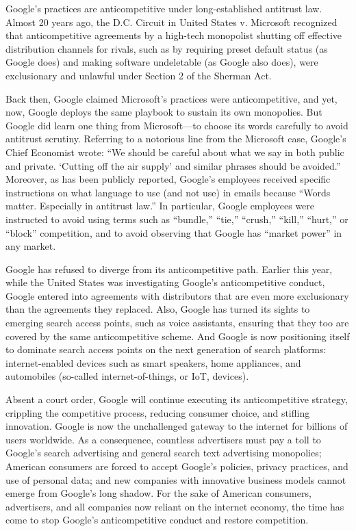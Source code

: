 \documentclass[11pt,b5paper,headings=small]{scrartcl}
\begin{document}

Google’s practices are anticompetitive under long-established antitrust law.
Almost 20 years ago, the D.C. Circuit in United States v. Microsoft recognized that
anticompetitive agreements by a high-tech monopolist shutting off effective distribution channels
for rivals, such as by requiring preset default status (as Google does) and making software
undeletable (as Google also does), were exclusionary and unlawful under Section 2 of the
Sherman Act.


Back then, Google claimed Microsoft’s practices were anticompetitive, and yet,
now, Google deploys the same playbook to sustain its own monopolies. But Google did learn
one thing from Microsoft—to choose its words carefully to avoid antitrust scrutiny. Referring to
a notorious line from the Microsoft case, Google’s Chief Economist wrote: “We should be
careful about what we say in both public and private. ‘Cutting off the air supply’ and similar
phrases should be avoided.” Moreover, as has been publicly reported, Google’s employees
received specific instructions on what language to use (and not use) in emails because “Words
matter. Especially in antitrust law.” In particular, Google employees were instructed to avoid
using terms such as “bundle,” “tie,” “crush,” “kill,” “hurt,” or “block” competition, and to avoid
observing that Google has “market power” in any market.


Google has refused to diverge from its anticompetitive path. Earlier this year,
while the United States was investigating Google’s anticompetitive conduct, Google entered into
agreements with distributors that are even more exclusionary than the agreements they replaced.
Also, Google has turned its sights to emerging search access points, such as voice assistants,
ensuring that they too are covered by the same anticompetitive scheme. And Google is now
positioning itself to dominate search access points on the next generation of search platforms:
internet-enabled devices such as smart speakers, home appliances, and automobiles (so-called
internet-of-things, or IoT, devices).


Absent a court order, Google will continue executing its anticompetitive strategy,
crippling the competitive process, reducing consumer choice, and stifling innovation. Google is
now the unchallenged gateway to the internet for billions of users worldwide. As a consequence,
countless advertisers must pay a toll to Google’s search advertising and general search text
advertising monopolies; American consumers are forced to accept Google’s policies, privacy
practices, and use of personal data; and new companies with innovative business models cannot
emerge from Google’s long shadow. For the sake of American consumers, advertisers, and all
companies now reliant on the internet economy, the time has come to stop Google’s
anticompetitive conduct and restore competition.
\end{document}
